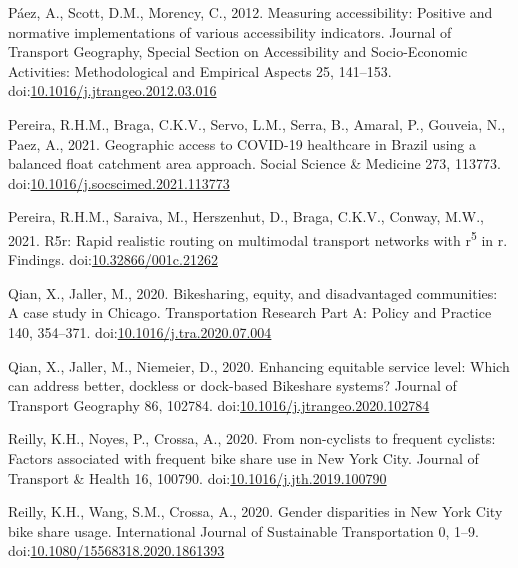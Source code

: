 \documentclass[]{elsarticle} %
\begin{document}
\leavevmode\hypertarget{ref-paezMeasuringAccessibilityPositive2012}{}%
Páez, A., Scott, D.M., Morency, C., 2012. Measuring accessibility:
Positive and normative implementations of various accessibility
indicators. Journal of Transport Geography, Special Section on
Accessibility and Socio-Economic Activities: Methodological and
Empirical Aspects 25, 141--153.
doi:\href{https://doi.org/10.1016/j.jtrangeo.2012.03.016}{10.1016/j.jtrangeo.2012.03.016}

\leavevmode\hypertarget{ref-pereiraGeographicAccessCOVID192021}{}%
Pereira, R.H.M., Braga, C.K.V., Servo, L.M., Serra, B., Amaral, P.,
Gouveia, N., Paez, A., 2021. Geographic access to COVID-19 healthcare in
Brazil using a balanced float catchment area approach. Social Science \&
Medicine 273, 113773.
doi:\href{https://doi.org/10.1016/j.socscimed.2021.113773}{10.1016/j.socscimed.2021.113773}

\leavevmode\hypertarget{ref-Pereira2021r5r}{}%
Pereira, R.H.M., Saraiva, M., Herszenhut, D., Braga, C.K.V., Conway,
M.W., 2021. R5r: Rapid realistic routing on multimodal transport
networks with r\textsuperscript{5} in r. Findings.
doi:\href{https://doi.org/10.32866/001c.21262}{10.32866/001c.21262}

\leavevmode\hypertarget{ref-qianBikesharingEquityDisadvantaged2020}{}%
Qian, X., Jaller, M., 2020. Bikesharing, equity, and disadvantaged
communities: A case study in Chicago. Transportation Research Part A:
Policy and Practice 140, 354--371.
doi:\href{https://doi.org/10.1016/j.tra.2020.07.004}{10.1016/j.tra.2020.07.004}

\leavevmode\hypertarget{ref-qianEnhancingEquitableService2020}{}%
Qian, X., Jaller, M., Niemeier, D., 2020. Enhancing equitable service
level: Which can address better, dockless or dock-based Bikeshare
systems? Journal of Transport Geography 86, 102784.
doi:\href{https://doi.org/10.1016/j.jtrangeo.2020.102784}{10.1016/j.jtrangeo.2020.102784}

\leavevmode\hypertarget{ref-reillyNoncyclistsFrequentCyclists2020}{}%
Reilly, K.H., Noyes, P., Crossa, A., 2020. From non-cyclists to frequent
cyclists: Factors associated with frequent bike share use in New York
City. Journal of Transport \& Health 16, 100790.
doi:\href{https://doi.org/10.1016/j.jth.2019.100790}{10.1016/j.jth.2019.100790}

\leavevmode\hypertarget{ref-reillyGenderDisparitiesNew2020}{}%
Reilly, K.H., Wang, S.M., Crossa, A., 2020. Gender disparities in New
York City bike share usage. International Journal of Sustainable
Transportation 0, 1--9.
doi:\href{https://doi.org/10.1080/15568318.2020.1861393}{10.1080/15568318.2020.1861393}
\end{document}
